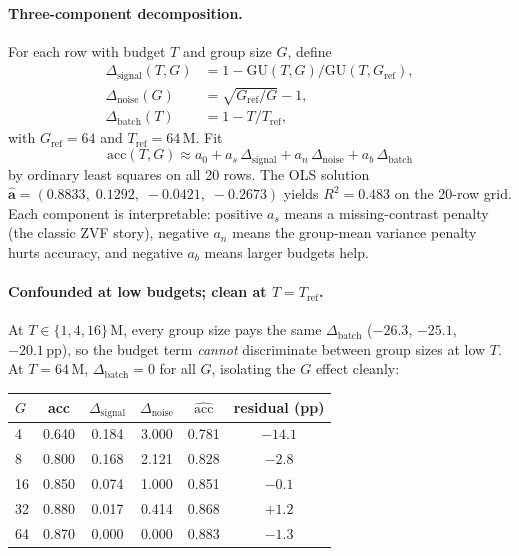 \paragraph{Three-component decomposition.}
For each row with budget $T$ and group size $G$, define
\begin{align*}
\Delta_{\mathrm{signal}}(T, G) &= 1 - \mathrm{GU}(T, G) / \mathrm{GU}(T, G_{\mathrm{ref}}), \\
\Delta_{\mathrm{noise}}(G)     &= \sqrt{G_{\mathrm{ref}}/G} - 1, \\
\Delta_{\mathrm{batch}}(T)    &= 1 - T / T_{\mathrm{ref}},
\end{align*}
with $G_{\mathrm{ref}} = 64$ and $T_{\mathrm{ref}} = 64\,\mathrm{M}$.
Fit
\[
\mathrm{acc}(T, G) \approx a_0 + a_s\,\Delta_{\mathrm{signal}}
                              + a_n\,\Delta_{\mathrm{noise}}
                              + a_b\,\Delta_{\mathrm{batch}}
\]
by ordinary least squares on all 20 rows.  The OLS solution
$\hat{\boldsymbol a} = (0.8833,\; 0.1292,\; -0.0421,\; -0.2673)$
yields $R^2 = 0.483$ on the 20-row grid.  Each component is
interpretable: positive $a_s$ means a missing-contrast penalty (the
classic ZVF story), negative $a_n$ means the group-mean variance
penalty hurts accuracy, and negative $a_b$ means larger budgets
help.

\paragraph{Confounded at low budgets; clean at $T{=}T_{\mathrm{ref}}$.}
At $T \in \{1, 4, 16\}\,\mathrm{M}$, every group size pays the same
$\Delta_{\mathrm{batch}}$ ($-26.3$, $-25.1$, $-20.1\,\mathrm{pp}$),
so the budget term \emph{cannot} discriminate between group sizes
at low $T$.  At $T{=}64\,\mathrm{M}$, $\Delta_{\mathrm{batch}} = 0$
for all $G$, isolating the $G$ effect cleanly:

\begin{center}
\small
\begin{tabular}{lccccc}
\toprule
$G$ & acc & $\Delta_{\mathrm{signal}}$ & $\Delta_{\mathrm{noise}}$
       & $\hat{\mathrm{acc}}$ & residual (pp) \\
\midrule
 4 & 0.640 & 0.184 & 3.000 & 0.781 & $-14.1$ \\
 8 & 0.800 & 0.168 & 2.121 & 0.828 & $-2.8$ \\
16 & 0.850 & 0.074 & 1.000 & 0.851 & $-0.1$ \\
32 & 0.880 & 0.017 & 0.414 & 0.868 & $+1.2$ \\
64 & 0.870 & 0.000 & 0.000 & 0.883 & $-1.3$ \\
\bottomrule
\end{tabular}
\end{center}

